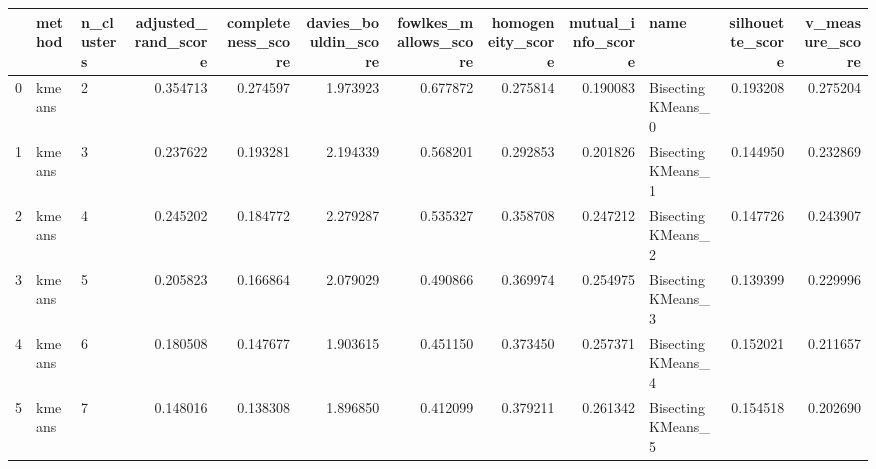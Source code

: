 \begin{tabular}{lllrrrrrrlrr}
\toprule
{} &  method & n\_clusters &  adjusted\_rand\_score &  completeness\_score &  davies\_bouldin\_score &  fowlkes\_mallows\_score &  homogeneity\_score &  mutual\_info\_score &                name &  silhouette\_score &  v\_measure\_score \\
\midrule
0 &  kmeans &          2 &             0.354713 &            0.274597 &              1.973923 &               0.677872 &           0.275814 &           0.190083 &  Bisecting KMeans\_0 &          0.193208 &         0.275204 \\
1 &  kmeans &          3 &             0.237622 &            0.193281 &              2.194339 &               0.568201 &           0.292853 &           0.201826 &  Bisecting KMeans\_1 &          0.144950 &         0.232869 \\
2 &  kmeans &          4 &             0.245202 &            0.184772 &              2.279287 &               0.535327 &           0.358708 &           0.247212 &  Bisecting KMeans\_2 &          0.147726 &         0.243907 \\
3 &  kmeans &          5 &             0.205823 &            0.166864 &              2.079029 &               0.490866 &           0.369974 &           0.254975 &  Bisecting KMeans\_3 &          0.139399 &         0.229996 \\
4 &  kmeans &          6 &             0.180508 &            0.147677 &              1.903615 &               0.451150 &           0.373450 &           0.257371 &  Bisecting KMeans\_4 &          0.152021 &         0.211657 \\
5 &  kmeans &          7 &             0.148016 &            0.138308 &              1.896850 &               0.412099 &           0.379211 &           0.261342 &  Bisecting KMeans\_5 &          0.154518 &         0.202690 \\
\bottomrule
\end{tabular}
